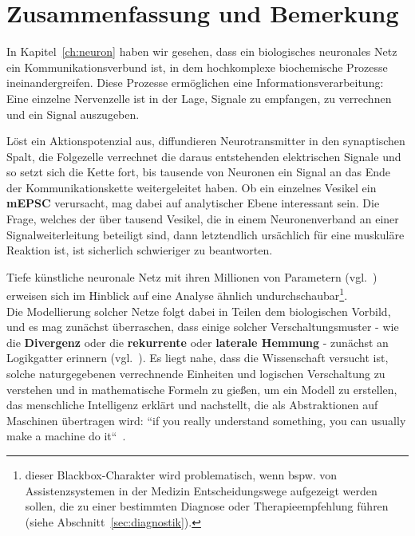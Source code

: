 \chapter{Zusammenfassung und Bemerkung}



In Kapitel~\ref{ch:neuron} haben wir gesehen, dass ein biologisches neuronales Netz ein Kommunikationsverbund ist, in dem hochkomplexe biochemische Prozesse ineinandergreifen.
Diese Prozesse ermöglichen eine Informationsverarbeitung: Eine einzelne Nervenzelle ist in der Lage, Signale zu empfangen, zu verrechnen und ein Signal auszugeben.


 Löst ein Aktionspotenzial aus, diffundieren Neurotransmitter in den synaptischen Spalt, die Folgezelle verrechnet die daraus entstehenden elektrischen Signale und so setzt sich die Kette fort, bis tausende von Neuronen ein Signal an das Ende der Kommunikationskette weitergeleitet haben.
Ob ein einzelnes Vesikel ein \textbf{mEPSC} verursacht, mag dabei auf analytischer Ebene interessant sein.
Die Frage, welches der über tausend Vesikel, die in einem Neuronenverband an einer Signalweiterleitung beteiligt sind, dann letztendlich ursächlich für eine muskuläre Reaktion ist, ist sicherlich schwieriger zu beantworten.

Tiefe künstliche neuronale Netz mit ihren Millionen von Parametern (vgl.~\cite{SVI+15}) erweisen sich im Hinblick auf eine Analyse ähnlich undurchschaubar\footnote{ dieser Blackbox-Charakter wird problematisch, wenn {bspw.} von Assistenzsystemen in der Medizin Entscheidungswege aufgezeigt werden sollen, die zu einer bestimmten Diagnose oder Therapieempfehlung führen (siehe Abschnitt~\ref{sec:diagnostik}).}.\\

Die Modellierung solcher Netze folgt dabei in Teilen dem biologischen Vorbild, und es mag zunächst überraschen, dass einige solcher Verschaltungsmuster - wie die \textbf{Divergenz} oder die \textbf{rekurrente} oder \textbf{laterale Hemmung} - zunächst an Logikgatter erinnern (vgl.~\cite[58 f.]{Eil19}). Es liegt nahe, dass die Wissenschaft versucht ist, solche naturgegebenen verrechnende Einheiten und logischen Verschaltung zu verstehen und in mathematische Formeln zu gießen, um ein Modell zu erstellen, das menschliche Intelligenz erklärt und nachstellt, die als Abstraktionen auf Maschinen übertragen wird: ``if you really understand something, you can usually make a machine do it``~\cite[xiii]{AR88}.\\

